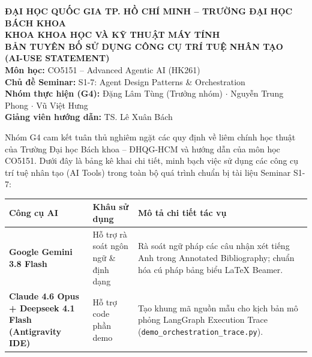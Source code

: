 \documentclass[11pt,a4paper]{article}
\begin{document}

\begin{center}
  {\small \textbf{ĐẠI HỌC QUỐC GIA TP. HỒ CHÍ MINH -- TRƯỜNG ĐẠI HỌC BÁCH KHOA}}\\[0.05cm]
  {\small \textbf{KHOA KHOA HỌC VÀ KỸ THUẬT MÁY TÍNH}}\\[0.1cm]
  {\large\bfseries\color{hcmutblue} BẢN TUYÊN BỐ SỬ DỤNG CÔNG CỤ TRÍ TUỆ NHÂN TẠO}\\[0.05cm]
  {\large\bfseries\color{hcmutblue} (AI-USE STATEMENT)}\\[0.2cm]
  {\normalsize \textbf{Môn học:} CO5151 -- Advanced Agentic AI (HK261)}\\
  {\normalsize \textbf{Chủ đề Seminar:} S1-7: Agent Design Patterns \& Orchestration}\\
  {\normalsize \textbf{Nhóm thực hiện (G4):} Đặng Lâm Tùng (Trưởng nhóm) $\cdot$ Nguyễn Trung Phong $\cdot$ Vũ Việt Hưng}\\
  {\normalsize \textbf{Giảng viên hướng dẫn:} TS. Lê Xuân Bách}
\end{center}

\vspace{0.4cm}
\noindent Nhóm G4 cam kết tuân thủ nghiêm ngặt các quy định về liêm chính học thuật của Trường Đại học Bách khoa -- ĐHQG-HCM và hướng dẫn của môn học CO5151. Dưới đây là bảng kê khai chi tiết, minh bạch việc sử dụng các công cụ trí tuệ nhân tạo (AI Tools) trong toàn bộ quá trình chuẩn bị tài liệu Seminar S1-7:

\vspace{0.3cm}
\begin{table}[h]
\centering
\small
\begin{tabular}{p{3.2cm}p{4.2cm}p{6.8cm}}
\toprule
\textbf{Công cụ AI} & \textbf{Khâu sử dụng} & \textbf{Mô tả chi tiết tác vụ} \\
\midrule
\textbf{Google Gemini 3.8 Flash} & Hỗ trợ rà soát ngôn ngữ \& định dạng & Rà soát ngữ pháp các câu nhận xét tiếng Anh trong Annotated Bibliography; chuẩn hóa cú pháp bảng biểu LaTeX Beamer. \\
\addlinespace
\textbf{Claude 4.6 Opus + Deepseek 4.1 Flash (Antigravity IDE)} & Hỗ trợ code phần demo & Tạo khung mã nguồn mẫu cho kịch bản mô phỏng LangGraph Execution Trace (\texttt{demo\_orchestration\_trace.py}). \\
\bottomrule
\end{tabular}
\end{table}
\end{document}
